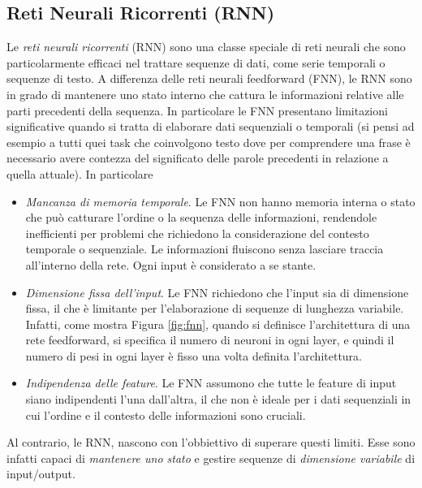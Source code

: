 \documentclass[12pt,a4paper,twoside,openright]{book}
\begin{document}
\subsection{Reti Neurali Ricorrenti (RNN)}
\label{rnn}
Le \emph{reti neurali ricorrenti} (RNN) sono una classe speciale di reti neurali che sono particolarmente efficaci nel trattare sequenze di dati, come serie temporali o sequenze di testo. A differenza delle reti neurali feedforward (FNN), le RNN sono in grado di mantenere uno stato interno che cattura le informazioni relative alle parti precedenti della sequenza.
In particolare le FNN presentano limitazioni significative quando si tratta di elaborare dati sequenziali o temporali (si pensi ad esempio a tutti quei task che coinvolgono testo dove per comprendere una frase è necessario avere contezza del significato delle parole precedenti in relazione a quella attuale). In particolare
\begin{itemize}
    \item \emph{Mancanza di memoria temporale}. Le FNN non hanno memoria interna o stato che può catturare l'ordine o la sequenza delle informazioni, rendendole inefficienti per problemi che richiedono la considerazione del contesto temporale o sequenziale. Le informazioni fluiscono senza lasciare traccia all'interno della rete. Ogni input è considerato a se stante. 
    \item \emph{Dimensione fissa dell'input}. Le FNN richiedono che l'input sia di dimensione fissa, il che è limitante per l'elaborazione di sequenze di lunghezza variabile. Infatti, come mostra Figura \ref{fig:fnn}, quando si definisce l'architettura di una rete feedforward, si specifica il numero di neuroni in ogni layer, e quindi il numero di pesi in ogni layer è fisso una volta definita l'architettura. 
    \item \emph{Indipendenza delle feature}. Le FNN assumono che tutte le feature di input siano indipendenti l'una dall'altra, il che non è ideale per i dati sequenziali in cui l'ordine e il contesto delle informazioni sono cruciali.
\end{itemize}
Al contrario, le RNN, nascono con l'obbiettivo di superare questi limiti. Esse sono infatti capaci di \emph{mantenere uno stato} e gestire sequenze di \emph{dimensione variabile} di input/output.
\end{document}
